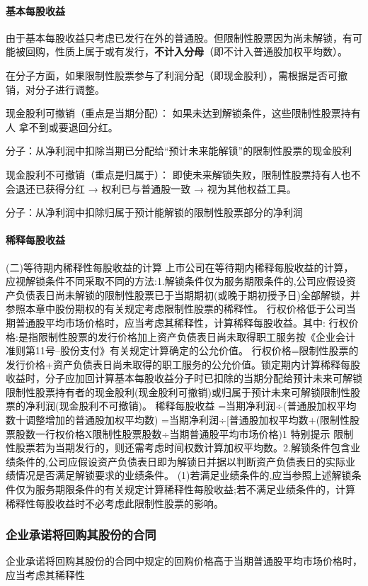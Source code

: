 \documentclass[UTF8,12pt]{ctexart}
\numberwithin{equation}{section} %
\numberwithin{figure}{section}
\numberwithin{table}{section}
\begin{document}
	\paragraph{基本每股收益}
	
	由于基本每股收益只考虑已发行在外的普通股。但限制性股票因为尚未解锁，有可能被回购，性质上属于或有发行，\textbf{不计入分母}（即不计入普通股加权平均数）。
	
	在分子方面，如果限制性股票参与了利润分配（即现金股利），需根据是否可撤销，对分子进行调整。
	
	现金股利可撤销（重点是当期分配）：
	如果未达到解锁条件，这些限制性股票持有人 拿不到或要退回分红。
	
	分子：从净利润中扣除当期已分配给“预计未来能解锁”的限制性股票的现金股利
	

	现金股利不可撤销（重点是归属于）：
	即使未来解锁失败，限制性股票持有人也不会退还已获得分红 → 权利已与普通股一致 → 视为其他权益工具。
	
	分子：从净利润中扣除归属于预计能解锁的限制性股票部分的净利润
	
	\paragraph{稀释每股收益}
	
	(二)等待期内稀释性每股收益的计算
	上市公司在等待期内稀释每股收益的计算，应视解锁条件不同采取不同的方法:1.解锁条件仅为服务期限条件的,公司应假设资产负债表日尚未解锁的限制性股票已于当期期初(或晚于期初授予日)全部解锁，并参照本章中股份期权的有关规定考虑限制性股票的稀释性。
	行权价格低于公司当期普通股平均市场价格时，应当考虑其稀释性，计算稀释每股收益。其中:
	行权价格:是指限制性股票的发行价格加上资产负债表日尚未取得职工服务按《企业会计准则第11号--股份支付》有关规定计算确定的公允价值。
	行权价格=限制性股票的发行价格+资产负债表日尚未取得的职工服务的公允价值。锁定期内计算稀释每股收益时，分子应加回计算基本每股收益分子时已扣除的当期分配给预计未来可解锁限制性股票持有者的现金股利(现金股利可撤销)或归属于预计未来可解锁限制性股票的净利润(现金股利不可撤销)。
	稀释每股收益
	=当期净利润÷(普通股加权平均数十调整增加的普通股加权平均数)
	=当期净利润÷[普通股加权平均数+(限制性股票股数一行权价格X限制性股票股数÷当期普通股平均市场价格)1
	特别提示
	限制性股票若为当期发行的，则还需考虑时间权数计算加权平均数。2.解锁条件包含业绩条件的,公司应假设资产负债表日即为解锁日并据以判断资产负债表日的实际业绩情况是否满足解锁要求的业绩条件。
	(1)若满足业绩条件的,应当参照上述解锁条件仅为服务期限条件的有关规定计算稀释性每股收益;若不满足业绩条件的，计算稀释性每股收益时不必考虑此限制性股票的影响。
	\subsubsection{企业承诺将回购其股份的合同}
	企业承诺将回购其股份的合同中规定的回购价格高于当期普通股平均市场价格时，应当考虑其稀释性
	
\end{document}
